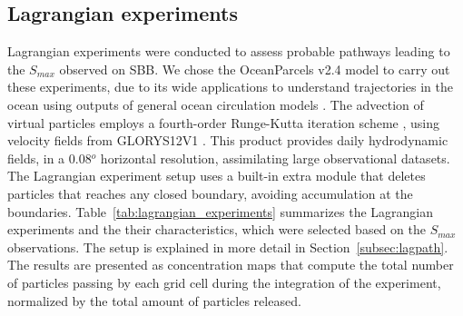 \documentclass[draft]{agujournal2019}
\begin{document}
\subsection{Lagrangian experiments} 

Lagrangian experiments were conducted to assess probable pathways leading to the \textit{$S_{max}$} observed on SBB. We chose the OceanParcels v2.4 model \cite{delandmeter2019parcels} to carry out these experiments, due to its wide applications to understand trajectories in the ocean using outputs of general ocean circulation models \cite{valles2022water,dawson2023pathways,seijo2023intrusions}. The advection of virtual particles employs a fourth-order Runge-Kutta iteration scheme \cite{delandmeter2019parcels}, using velocity fields from GLORYS12V1 \cite{jean2021glorys}. This product provides daily hydrodynamic fields, in a 0.08$^o$ horizontal resolution, assimilating large observational datasets. The Lagrangian experiment setup uses a built-in extra module that deletes particles that reaches any closed boundary, avoiding accumulation at the boundaries. Table~\ref{tab:lagrangian_experiments} summarizes the Lagrangian experiments and the their characteristics, which were selected based on the \textit{$S_{max}$} observations. The setup is explained in more detail in Section~\ref{subsec:lagpath}. The results are presented as concentration maps that compute the total number of particles passing by each grid cell during the integration of the experiment, normalized by the total amount of particles released.
\end{document}
